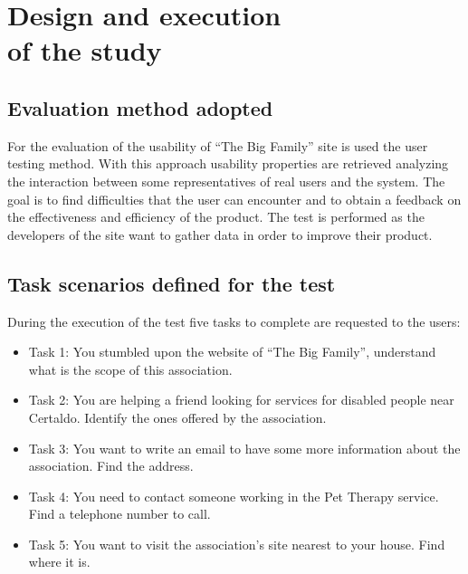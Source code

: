 %
%
\chapter{Design and execution\\of the study}
%
%
%
\section{Evaluation method adopted}
For the evaluation of the usability of ``The Big Family'' site is used the user testing method. With this approach usability properties are retrieved analyzing the interaction between some representatives of real users and the system. The goal is to find difficulties that the user can encounter and to obtain a feedback on the effectiveness and efficiency of the product. The test is performed as the developers of the site want to gather data in order to improve their product.
%
%
\section{Task scenarios defined for the test}
During the execution of the test five tasks to complete are requested to the users:
\begin{itemize}
\item Task 1: You stumbled upon the website of ``The Big Family'', understand what is the scope of this association.
\item Task 2: You are helping a friend looking for services for disabled people near Certaldo. Identify the ones offered by the association.
\item Task 3: You want to write an email to have some more information about the association. Find the address.
\item Task 4: You need to contact someone working in the Pet Therapy service. Find a telephone number to call.
\item Task 5: You want to visit the association's site nearest to your house. Find where it is.
\end{itemize}
%
%
